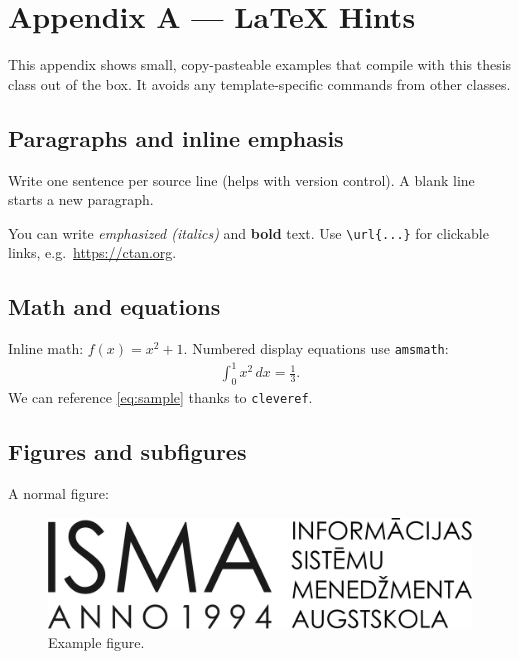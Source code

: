 \chapter{Appendix A — LaTeX Hints}
\label{chap:latexhints}


\newenvironment{twocoldemo}[1][]{%
  \par\noindent
  \begin{minipage}[t]{.48\linewidth}\raggedright
  \textbf{Code}\par\smallskip
}{%
  \end{minipage}\hfill
  \begin{minipage}[t]{.48\linewidth}\raggedright
  \textbf{Output}\par\smallskip
  \end{minipage}\par
}



This appendix shows small, copy-pasteable examples that compile with this thesis class out of the box. It avoids any template-specific commands from other classes.

\section{Paragraphs and inline emphasis}
Write one sentence per source line (helps with version control). A blank line starts a new paragraph.

You can write \emph{emphasized (italics)} and \textbf{bold} text. Use \verb|\url{...}| for clickable links, e.g.\ \url{https://ctan.org}.

\section{Math and equations}
Inline math: $f(x)=x^2+1$. Numbered display equations use \texttt{amsmath}:
\begin{align}
  \label{eq:sample}
  \int_0^1 x^2\,dx = \frac{1}{3}.
\end{align}
We can reference \cref{eq:sample} thanks to \texttt{cleveref}.

\section{Figures and subfigures}
A normal figure:
\begin{figure}[h]
  \centering
  \includegraphics[width=.7\linewidth]{b_chapters/chapter1/assets/isma_logo.png}
  \caption{Example figure.}
  \label{fig:example}
\end{figure}

